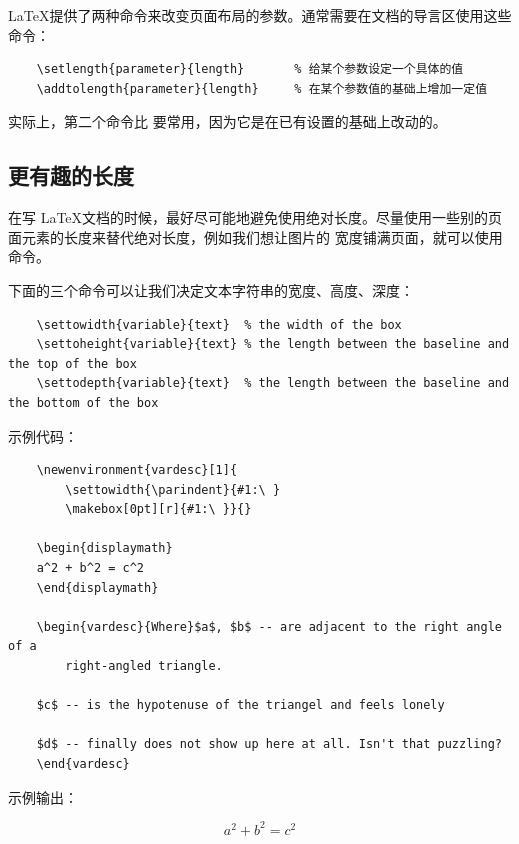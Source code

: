 \documentclass[UTF8]{ctexart}
\begin{document}
\LaTeX 提供了两种命令来改变页面布局的参数。通常需要在文档的导言区使用这些命令：
\begin{verbatim}
    \setlength{parameter}{length}       % 给某个参数设定一个具体的值
    \addtolength{parameter}{length}     % 在某个参数值的基础上增加一定值
\end{verbatim}

实际上，第二个命令比 \texttt{\setlength} 要常用，因为它是在已有设置的基础上改动的。

\subsection{更有趣的长度}
在写 \LaTeX 文档的时候，最好尽可能地避免使用绝对长度。尽量使用一些别的页面元素的长度来替代绝对长度，例如我们想让图片的
宽度铺满页面，就可以使用 \texttt{\textwidth} 命令。

下面的三个命令可以让我们决定文本字符串的宽度、高度、深度：
\begin{verbatim}
    \settowidth{variable}{text}  % the width of the box
    \settoheight{variable}{text} % the length between the baseline and the top of the box
    \settodepth{variable}{text}  % the length between the baseline and the bottom of the box
\end{verbatim}

示例代码：
\begin{verbatim}
    \newenvironment{vardesc}[1]{
        \settowidth{\parindent}{#1:\ }
        \makebox[0pt][r]{#1:\ }}{}

    \begin{displaymath}
    a^2 + b^2 = c^2
    \end{displaymath}

    \begin{vardesc}{Where}$a$, $b$ -- are adjacent to the right angle of a
        right-angled triangle.

    $c$ -- is the hypotenuse of the triangel and feels lonely

    $d$ -- finally does not show up here at all. Isn't that puzzling?
    \end{vardesc}
\end{verbatim}

示例输出：
\newenvironment{vardesc}[1]{
    \settowidth{\parindent}{#1:\ }
    \makebox[0pt][r]{#1:\ }}{}

\begin{displaymath}
a^2 + b^2 = c^2
\end{displaymath}
\end{document}
